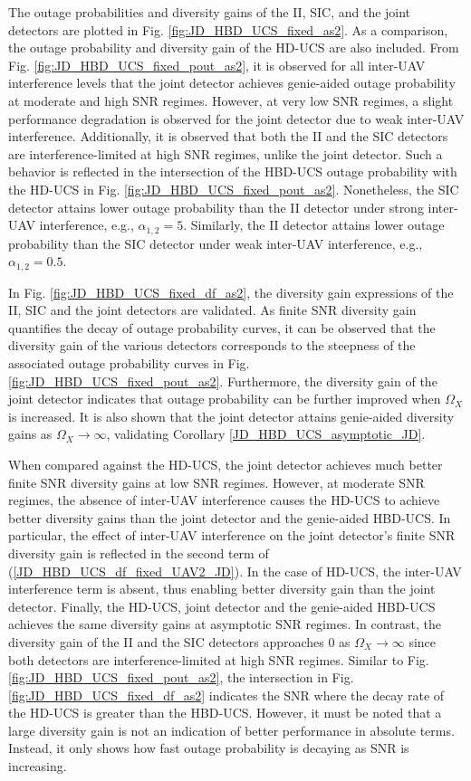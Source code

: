 The outage probabilities and diversity gains of the II, SIC, and the joint detectors are plotted in Fig. \ref{fig:JD_HBD_UCS_fixed_as2}. As a comparison, the outage probability and diversity gain of the HD-UCS are also included. From Fig. \ref{fig:JD_HBD_UCS_fixed_pout_as2}, it is observed for all inter-UAV interference levels that the joint detector achieves genie-aided outage probability at moderate and high SNR regimes. However, at very low SNR regimes, a slight performance degradation is observed for the joint detector due to weak inter-UAV interference. Additionally, it is observed that both the II and the SIC detectors are interference-limited at high SNR regimes, unlike the joint detector. Such a behavior is reflected in the intersection of the HBD-UCS outage probability with the HD-UCS in Fig. \ref{fig:JD_HBD_UCS_fixed_pout_as2}. Nonetheless, the SIC detector attains lower outage probability than the II detector under strong inter-UAV interference, e.g., $\alpha_{1,2}=5$. Similarly, the II detector attains lower outage probability than the SIC detector under weak inter-UAV interference, e.g., $\alpha_{1,2}=0.5$. 

In Fig. \ref{fig:JD_HBD_UCS_fixed_df_as2}, the diversity gain expressions of the II, SIC and the joint detectors are validated. As finite SNR diversity gain quantifies the decay of outage probability curves, it can be observed that the diversity gain of the various detectors corresponds to the steepness of the associated outage probability curves in Fig. \ref{fig:JD_HBD_UCS_fixed_pout_as2}. Furthermore, the diversity gain of the joint detector indicates that outage probability can be further improved when $\Omega_X$ is increased. It is also shown that the joint detector attains genie-aided diversity gains as $\Omega_X \to \infty$, validating Corollary \ref{JD_HBD_UCS_asymptotic_JD}. 

When compared against the HD-UCS, the joint detector achieves much better finite SNR diversity gains at low SNR regimes. However, at moderate SNR regimes, the absence of inter-UAV interference causes the HD-UCS to achieve better diversity gains than the joint detector and the genie-aided HBD-UCS. In particular, the effect of inter-UAV interference on the joint detector's finite SNR diversity gain is reflected in the second term of (\ref{JD_HBD_UCS_df_fixed_UAV2_JD}). In the case of HD-UCS, the inter-UAV interference term is absent, thus enabling better diversity gain than the joint detector. Finally, the HD-UCS, joint detector and the genie-aided HBD-UCS achieves the same diversity gains at asymptotic SNR regimes. In contrast, the diversity gain of the II and the SIC detectors approaches 0 as $\Omega_X \to \infty$ since both detectors are interference-limited at high SNR regimes. Similar to Fig. \ref{fig:JD_HBD_UCS_fixed_pout_as2}, the intersection in Fig. \ref{fig:JD_HBD_UCS_fixed_df_as2} indicates the SNR where the decay rate of the HD-UCS is greater than the HBD-UCS. However, it must be noted that a large diversity gain is not an indication of better performance in absolute terms. Instead, it only shows how fast outage probability is decaying as SNR is increasing.

